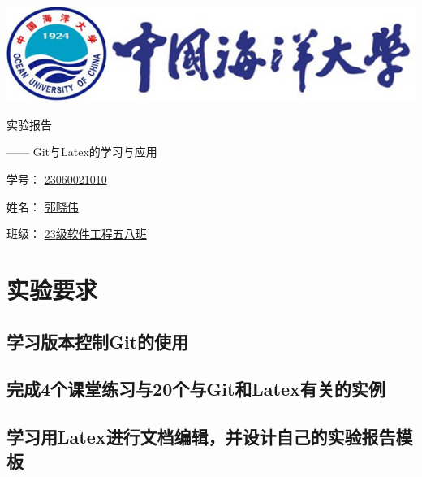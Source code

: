 \documentclass[UTF8,a4paper]{ctexart}
\begin{document}
\begin{sloppypar}


	\begin{center}
	\includegraphics[width = 14cm]{picture/s1}

		\begin{fontsize}{60pt}{20pt}
			实验报告
		\end{fontsize}

		\bigskip
		\bigskip
		
		\begin{fontsize}{20pt}{20pt}
			\begin{flushright}
				—— {\Huge Git}与{\Huge Latex}的学习与应用
			\end{flushright}
		\end{fontsize}
		
		\bigskip
		\bigskip
		\bigskip
		\bigskip
		\bigskip
		\bigskip
		\bigskip
		\bigskip
		\bigskip
		\bigskip
		\bigskip
		\bigskip
		\bigskip
		\bigskip
		\bigskip
		\bigskip
		
		\begin{fontsize}{25pt}{20pt}

			学号：
			\underline{{\huge 23060021010}}
			\bigskip
			\bigskip
			\bigskip
			\bigskip

			姓名：
			\underline{郭晓伟}
			\bigskip
			\bigskip
			\bigskip
			\bigskip

			班级：
			\underline{{\Huge 23}级软件工程五八班}
				
		\end{fontsize}
	\end{center}
	\section{实验要求}
	\subsection{学习版本控制Git的使用}
	\subsection{完成4个课堂练习与20个与Git和Latex有关的实例}
	\subsection{学习用Latex进行文档编辑，并设计自己的实验报告模板}

\end{sloppypar}
\end{document}
